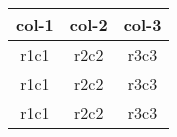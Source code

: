 \documentclass{article}
\begin{document}
	\begin{table}
		\centering
		\begin{tabular}{|c|c|c|}
			\hline
			col-1 &col-2 & col-3\\
			\hline
			r1c1 & r2c2&r3c3\\
			r1c1 & r2c2&r3c3\\
			r1c1 & r2c2&r3c3\\
			\hline
		\end{tabular}
	\end{table}
\end{document}
